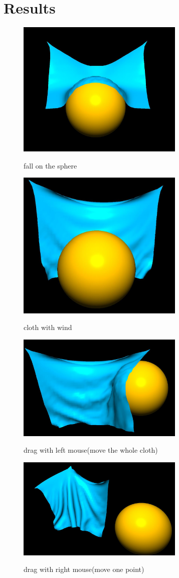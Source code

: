 \documentclass[acmtog]{acmart}
\begin{document}
\section{Results}
\begin{figure}[h]
	\centering
	{\includegraphics[width=8cm]{sphere.JPG}}	
	\caption{fall on the sphere}
\end{figure}
\begin{figure}[h]
	\centering
	{\includegraphics[width=8cm]{wind.JPG}}	
	\caption{cloth with wind}
\end{figure}
\begin{figure}[h]
	\centering
	{\includegraphics[width=8cm]{moveL.JPG}}
	\caption{drag with left mouse(move the whole cloth)}	
\end{figure}
\begin{figure}[h]
	\centering
	{\includegraphics[width=8cm]{moveR.JPG}}
	\caption{drag with right mouse(move one point)}	
\end{figure}
\end{document}
